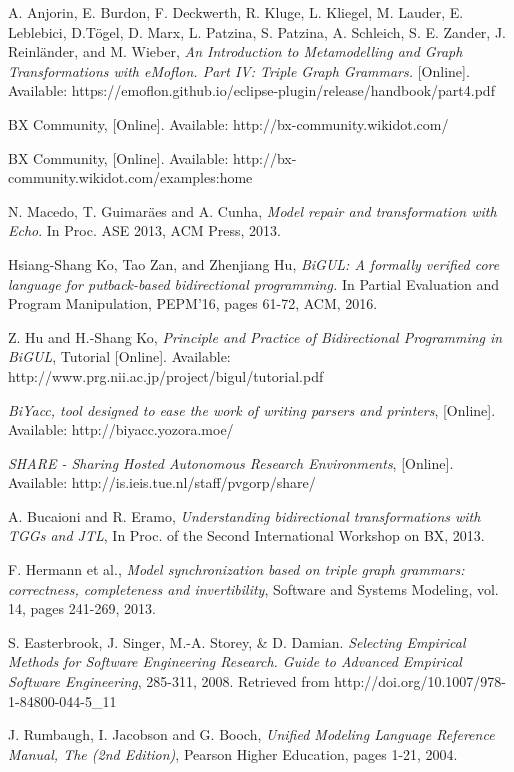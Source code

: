 \begin{thebibliography}{1}
	 A. Anjorin, E. Burdon, F. Deckwerth, R. Kluge, L. Kliegel, M. Lauder, E. Leblebici, D.T\"ogel, D. Marx, L. Patzina, S. Patzina, A. Schleich, S. E. Zander, J. Reinl\"ander, and M. Wieber, {\em An Introduction to Metamodelling and Graph Transformations with eMoflon. Part IV: Triple Graph Grammars.} [Online]. Available: 
	https://emoflon.github.io/eclipse-plugin/release/handbook/part4.pdf
	
	 BX Community, [Online]. Available: http://bx-community.wikidot.com/
	
	 BX Community, [Online]. Available: http://bx-community.wikidot.com/examples:home
	
	 N. Macedo, T. Guimar\"aes and A. Cunha, {\em Model repair and transformation with Echo}. In Proc. ASE 2013, ACM Press, 2013.
	
	 Hsiang-Shang Ko, Tao Zan, and Zhenjiang Hu, {\em BiGUL: A formally verified core language for putback-based bidirectional programming.} In Partial Evaluation and Program Manipulation, PEPM'16, pages 61-72, ACM, 2016.
	
	 Z. Hu and H.-Shang Ko,  {\em Principle and Practice of Bidirectional Programming in BiGUL}, Tutorial [Online]. Available: http://www.prg.nii.ac.jp/project/bigul/tutorial.pdf
	
	 {\em BiYacc, tool designed to ease the work of writing parsers and printers}, [Online]. Available: http://biyacc.yozora.moe/
	
	 {\em SHARE - Sharing Hosted Autonomous Research Environments}, [Online]. Available: http://is.ieis.tue.nl/staff/pvgorp/share/
	
	 A. Bucaioni and R. Eramo, {\em Understanding bidirectional transformations with TGGs and JTL}, In Proc. of the Second International Workshop on BX, 2013.
	
	 F. Hermann et al., {\em Model synchronization based on triple graph grammars: correctness, completeness and invertibility}, Software and Systems Modeling, vol. 14, pages 241-269, 2013.
	
	 S. Easterbrook, J. Singer, M.-A. Storey, \& D. Damian. {\em Selecting Empirical Methods for Software Engineering Research. Guide to Advanced Empirical Software Engineering}, 285-311, 2008. Retrieved from http://doi.org/10.1007/978-1-84800-044-5\_11
	
	 J. Rumbaugh, I. Jacobson and G. Booch, {\em Unified Modeling Language Reference Manual, The (2nd Edition)}, Pearson Higher Education, pages 1-21, 2004.
	

\end{thebibliography}
